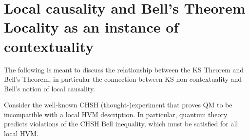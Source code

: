 \section[Local causality and Bell's Theorem\\ Locality as an instance of KS]{Local causality and Bell's Theorem\\ \large{Locality as an instance of contextuality}}

\label{sec:bell}
The following is meant to discuss the relationship between the KS Theorem and Bell's Theorem, in particular the connection between KS non-contextuality and Bell's notion of local causality. 

Consider the well-known CHSH (thought-)experiment \cite{Clauser1969,Colbeck2019,Spekkens2012} that proves QM to be incompatible with a local HVM description. In particular, quantum theory predicts violations of the CHSH Bell inequality, which must be satisfied for all local HVM.

